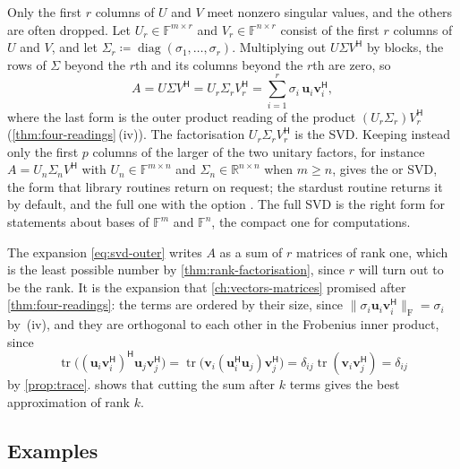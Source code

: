 Only the first $r$ columns of $U$ and $V$ meet nonzero singular values, and the others are often dropped. Let $U_r\in\mathbb F^{m\times r}$ and $V_r\in\mathbb F^{n\times r}$ consist of the first $r$ columns of $U$ and $V$, and let $\Sigma_r\coloneqq\operatorname{diag}(\sigma_1,\ldots,\sigma_r)$. Multiplying out $U\Sigma V^{\mathsf H}$ by blocks, the rows of $\Sigma$ beyond the $r$th and its columns beyond the $r$th are zero, so
\begin{equation}
A=U\Sigma V^{\mathsf H}=U_r\Sigma_rV_r^{\mathsf H}=\sum_{i=1}^r\sigma_i\,\mathbf u_i\mathbf v_i^{\mathsf H},
\label{eq:svd-outer}
\end{equation}
where the last form is the outer product reading of the product $(U_r\Sigma_r)V_r^{\mathsf H}$ (\cref{thm:four-readings}\,(iv)). The factorisation $U_r\Sigma_rV_r^{\mathsf H}$ is the  SVD. Keeping instead only the first $p$ columns of the larger of the two unitary factors, for instance $A=U_n\Sigma_nV^{\mathsf H}$ with $U_n\in\mathbb F^{m\times n}$ and $\Sigma_n\in\mathbb R^{n\times n}$ when $m\ge n$, gives the  or  SVD, the form that library routines return on request; the stardust routine  returns it by default, and the full one with the option . The full SVD is the right form for statements about bases of $\mathbb F^m$ and $\mathbb F^n$, the compact one for computations.

The expansion \eqref{eq:svd-outer} writes $A$ as a sum of $r$ matrices of rank one, which is the least possible number by \cref{thm:rank-factorisation}, since $r$ will turn out to be the rank. It is the expansion that \cref{ch:vectors-matrices} promised after \cref{thm:four-readings}: the terms are ordered by their size, since $\|\sigma_i\mathbf u_i\mathbf v_i^{\mathsf H}\|_{\mathrm F}=\sigma_i$ by \,(iv), and they are orthogonal to each other in the Frobenius inner product, since
\[
\operatorname{tr}\bigl((\mathbf u_i\mathbf v_i^{\mathsf H})^{\mathsf H}\mathbf u_j\mathbf v_j^{\mathsf H}\bigr)=\operatorname{tr}\bigl(\mathbf v_i(\mathbf u_i^{\mathsf H}\mathbf u_j)\mathbf v_j^{\mathsf H}\bigr)=\delta_{ij}\operatorname{tr}(\mathbf v_i\mathbf v_j^{\mathsf H})=\delta_{ij}
\]
by \cref{prop:trace}.  shows that cutting the sum after $k$ terms gives the best approximation of rank $k$.

\subsection{Examples}

